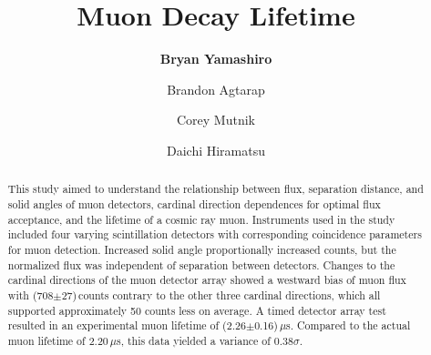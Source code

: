 \documentclass[aps,prl,twocolumn,superscriptaddress,nofootinbib]{revtex4-1}
\begin{document}





\title{Muon Decay Lifetime}


\author{\textbf{Bryan Yamashiro}}
\author{Brandon Agtarap}
\author{Corey Mutnik}
\author{Daichi Hiramatsu}






\begin{abstract}

This study aimed to understand the relationship between flux, separation distance, and solid angles of muon detectors, cardinal direction dependences for optimal flux acceptance, and the lifetime of a cosmic ray muon. Instruments used in the study included four varying scintillation detectors with corresponding coincidence parameters for muon detection. Increased solid angle proportionally increased counts, but the normalized flux was independent of separation between detectors. Changes to the cardinal directions of the muon detector array showed a westward bias of muon flux with (708$\pm$27)\,counts contrary to the other three cardinal directions, which all supported approximately 50 counts less on average. A timed detector array test resulted in an experimental muon lifetime of (2.26$\pm$0.16)\,$\mu$s. Compared to the actual muon lifetime of 2.20\,$\mu$s, this data yielded a variance of 0.38$\sigma$.



\end{abstract}

\maketitle    %
\end{document}
